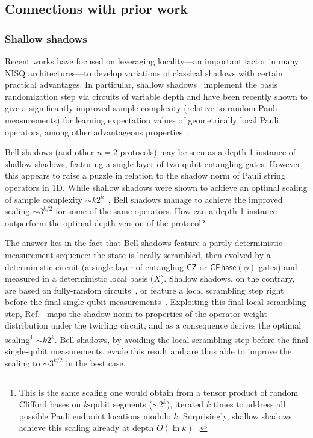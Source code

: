 \documentclass[a4paper,twocolumns,11pt,accepted=2024-03-04]{quantumarticle}
\newcommand{\CZ}{\ensuremath{\textsf{CZ}}}
\newcommand{\CPhase}[1]{\ensuremath{\textsf{CPhase}(#1)}}
\begin{document}
\subsection{Connections with prior work}\label{sec:previous}

\subsubsection{Shallow shadows}

Recent works have focused on leveraging locality---an important factor in many NISQ architectures---to develop variations of classical shadows with certain practical advantages.
In particular, {shallow shadows}~\cite{akhtar_scalable_2023,bertoni_shallow_2022} implement the basis randomization step via circuits of variable depth and have been recently shown to give a significantly improved sample complexity (relative to random Pauli measurements) for learning expectation values of geometrically local Pauli operators, among other advantageous properties~\cite{akhtar_scalable_2023,bertoni_shallow_2022,arienzo_closed-form_2022, ippoliti_operator_2023}.

Bell shadows (and other $n=2$ protocols) may be seen as a depth-1 instance of shallow shadows, featuring a single layer of two-qubit entangling gates.
However, this appears to raise a puzzle in relation to the shadow norm of Pauli string operators in 1D.
While shallow shadows were shown to achieve an optimal scaling of sample complexity $\sim k2^k$~\cite{ippoliti_operator_2023}, Bell shadows manage to achieve the improved scaling $\sim 3^{k/2}$ for some of the same operators. How can a depth-1 instance outperform the optimal-depth version of the protocol?

The answer lies in the fact that Bell shadows feature a partly deterministic measurement sequence: 
the state is locally-scrambled, then evolved by a deterministic circuit (a single layer of entangling $\CZ$ or $\CPhase{\phi}$ gates) and measured in a deterministic local basis ($X$). 
Shallow shadows, on the contrary, are based on fully-random circuits~\cite{bertoni_shallow_2022,arienzo_closed-form_2022}, or feature a local scrambling step right before the final single-qubit measurements~\cite{hu_classical_2023,akhtar_scalable_2023}.
Exploiting this final local-scrambling step, Ref.~\cite{ippoliti_operator_2023} maps the shadow norm to properties of the operator weight distribution under the twirling circuit, and as a consequence derives the optimal scaling\footnote{This is the same scaling one would obtain from a tensor product of random Clifford bases on $k$-qubit segments ($\sim 2^k$), iterated $k$ times to address all possible Pauli endpoint locations modulo $k$. Surprisingly, shallow shadows achieve this scaling already at depth $O(\ln k)$~\cite{ippoliti_operator_2023}.} $\sim k 2^k$.
Bell shadows, by avoiding the local scrambling step before the final single-qubit measurements, evade this result and are thus able to improve the scaling to $\sim 3^{k/2}$ in the best case. 
\end{document}
